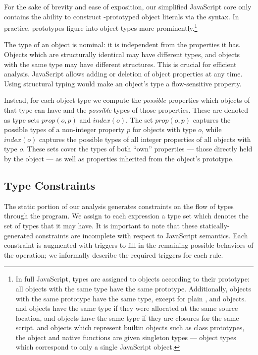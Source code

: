 For the sake of brevity and ease of exposition, our simplified JavaScript core
only contains the ability to construct -prototyped object
literals via the \code{\{\}} syntax. In practice, prototypes figure into object types more prominently.\footnote{
In full JavaScript, types are assigned to objects according to their prototype:
all objects with the same type have the same prototype.
Additionally, objects with the same prototype have the same type,
except for plain ,  and  objects.
 and  objects have the same type if they were
allocated at the same source location,
and  objects have the same type if they are closures
for the same script.
 and  objects which represent builtin objects
such as class prototypes, the  object and native functions
are given singleton types --- object types which correspond to only a single
JavaScript object.}

The type of an object is nominal: it is independent from the properties it
has. Objects which are structurally identical may have different types, and
objects with the same type may have different structures. This is crucial for
efficient analysis. JavaScript allows adding or deletion of object properties
at any time. Using structural typing would make an object's type a
flow-sensitive property.

Instead, for each object type we compute the \emph{possible} properties which
objects of that type can have and the \emph{possible} types of those properties.
These are denoted as type sets $\mathit{prop}(o,p)$ and
$\mathit{index}(o)$. The set $\mathit{prop}(o,p)$ captures the possible types
of a non-integer property $p$ for objects with type $o$, while
$\mathit{index}(o)$ captures the possible types of all integer properties of
all objects with type $o$.
These sets cover the types of both ``own'' properties --- those directly held
by the object --- as well as properties inherited from the object's prototype.

\subsection{Type Constraints}
\label{sec:constraints}

The static portion of our analysis generates constraints on the flow of types
through the program. We assign to each
expression a type set which denotes the set of types that it may
have. It is important to note that these statically-generated constraints are
incomplete with respect to JavaScript semantics. Each constraint is augmented
with triggers to fill in the remaining possible behaviors of the
operation; we informally describe the required triggers for each rule.

